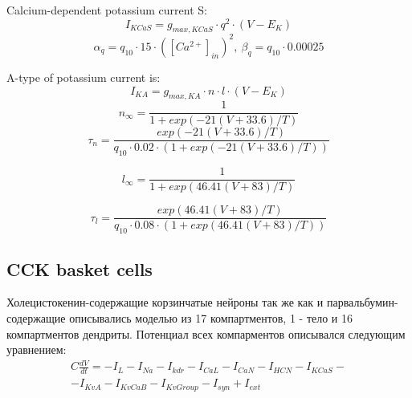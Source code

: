 \documentclass[12pt]{article}
\begin{document}
Calcium-dependent potassium current S:
\begin{equation}
\label{eq:KvCaS}
I_{KCaS} = g_{max, KCaS} \cdot q^2 \cdot (V - E_K)
\end{equation}
\begin{equation}
\alpha_q = q_{10} \cdot 15 \cdot ([Ca^{2+}]_{in})^2 , \  \beta_q = q_{10} \cdot 0.00025
\end{equation}

A-type of potassium current is:
\begin{equation}
\label{eq:KvA}
I_{KA} = g_{max, KA} \cdot n \cdot l \cdot (V - E_K)
\end{equation}
\begin{equation}
n_{\infty} = \frac{1}{1 + exp(-21(V + 33.6)/T)}
\end{equation}
\begin{equation}
\tau_n = \frac{exp(-21(V + 33.6)/T) }
{q_{10} \cdot 0.02 \cdot (1 + exp(-21(V + 33.6)/T))}
\end{equation}

\begin{equation}
l_{\infty} = \frac{1}{1 + exp(46.41(V + 83)/T)}
\end{equation}

\begin{equation}
\tau_l = \frac{exp(46.41(V + 83)/T) }
{q_{10} \cdot 0.08 \cdot (1 + exp(46.41(V + 83)/T))}
\end{equation}

\subsection{CCK basket cells}
Холецистокенин-содержащие корзинчатые нейроны так же как и парвальбумин-содержащие описывались моделью из 17 компартментов, 1 - тело и 16 компартментов дендриты. Потенциал всех компарментов описывался следующим уравнением:
\begin{eqnarray}
C\frac{dV}{dt}=-I_L-I_{Na}-I_{kdr}-I_{CaL}-I_{CaN}-I_{HCN}-I_{KCaS}- \nonumber \\
-I_{KvA}-I_{KvCaB}-I_{KvGroup}-I_{syn} + I_{ext}
\end{eqnarray}
\end{document}
